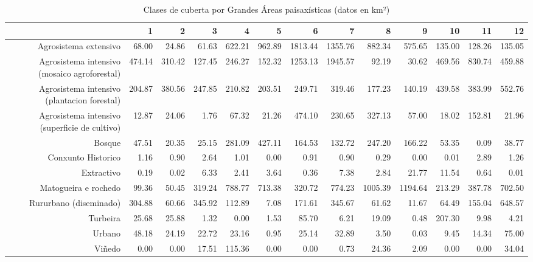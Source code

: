 \begin{table}[p]
\centering
\caption{Clases de cuberta por Grandes Áreas paisaxísticas (datos en km²)} 
\label{xtaboa2}
\begin{tabular}{rrrrrrrrrrrrr}
  \hline
 & 1 & 2 & 3 & 4 & 5 & 6 & 7 & 8 & 9 & 10 & 11 & 12 \\ 
  \hline
Agrosistema extensivo & 68.00 & 24.86 & 61.63 & 622.21 & 962.89 & 1813.44 & 1355.76 & 882.34 & 575.65 & 135.00 & 128.26 & 135.05 \\ 
  Agrosistema intensivo (mosaico agroforestal) & 474.14 & 310.42 & 127.45 & 246.27 & 152.32 & 1253.13 & 1945.57 & 92.19 & 30.62 & 469.56 & 830.74 & 459.88 \\ 
  Agrosistema intensivo (plantacion forestal) & 204.87 & 380.56 & 247.85 & 210.82 & 203.51 & 249.71 & 319.46 & 177.23 & 140.19 & 439.58 & 383.99 & 552.76 \\ 
  Agrosistema intensivo (superficie de cultivo) & 12.87 & 24.06 & 1.76 & 67.32 & 21.26 & 474.10 & 230.65 & 327.13 & 57.00 & 18.02 & 152.81 & 21.96 \\ 
  Bosque & 47.51 & 20.35 & 25.15 & 281.09 & 427.11 & 164.53 & 132.72 & 247.20 & 166.22 & 53.35 & 0.09 & 38.77 \\ 
  Conxunto Historico & 1.16 & 0.90 & 2.64 & 1.01 & 0.00 & 0.91 & 0.90 & 0.29 & 0.00 & 0.01 & 2.89 & 1.26 \\ 
  Extractivo & 0.19 & 0.02 & 6.33 & 2.41 & 3.64 & 0.36 & 7.38 & 2.84 & 21.77 & 11.54 & 0.64 & 0.01 \\ 
  Matogueira e rochedo & 99.36 & 50.45 & 319.24 & 788.77 & 713.38 & 320.72 & 774.23 & 1005.39 & 1194.64 & 213.29 & 387.78 & 702.50 \\ 
  Rururbano (diseminado) & 304.88 & 60.66 & 345.92 & 112.89 & 7.08 & 171.61 & 345.67 & 61.62 & 11.67 & 64.49 & 155.04 & 648.57 \\ 
  Turbeira & 25.68 & 25.88 & 1.32 & 0.00 & 1.53 & 85.70 & 6.21 & 19.09 & 0.48 & 207.30 & 9.98 & 4.21 \\ 
  Urbano & 48.18 & 24.19 & 22.72 & 23.16 & 0.95 & 25.14 & 32.89 & 3.50 & 0.03 & 9.45 & 14.34 & 75.00 \\ 
  Viñedo & 0.00 & 0.00 & 17.51 & 115.36 & 0.00 & 0.00 & 0.73 & 24.36 & 2.09 & 0.00 & 0.00 & 34.04 \\ 
   \hline
\end{tabular}
\end{table}
